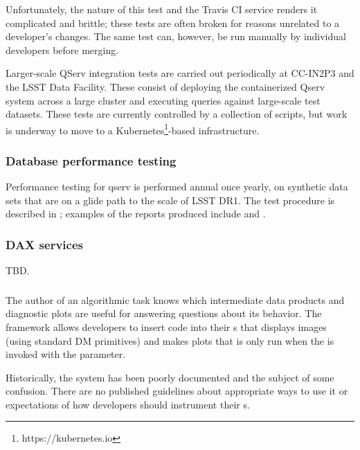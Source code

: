 \documentclass[DM,authoryear,toc,lsstdraft]{lsstdoc}
\begin{document}
Unfortunately, the nature of this test and the Travis CI service renders it
complicated and brittle; these tests are often broken for reasons unrelated to
a developer's changes. The same test can, however, be run manually by
individual developers before merging.

Larger-scale QServ integration tests are carried out periodically at CC-IN2P3
and the LSST Data Facility. These consist of deploying the containerized Qserv
system across a large cluster and executing queries against large-scale test
datasets. These tests are currently controlled by a collection of scripts, but
work is underway to move to a Kubernetes\footnote{https://kubernetes.io}-based
infrastructure.

\subsubsection{Database performance testing}
\label{sec:current:dax:dbperf}

Performance testing for qserv is performed annual once yearly, on synthetic
data sets that are on a glide path to the scale of LSST DR1. The test
procedure is described in ; examples of the reports produced
include  and .

\subsubsection{DAX services}

\begin{warning}
TBD.
\end{warning}

\subsubsection{}
\label{sec:current:dax:debugopt}

The author of an algorithmic task knows which intermediate data products and
diagnostic plots are useful for answering questions about its behavior. The
 framework allows developers to insert code into their
s that displays images (using standard DM primitives) and makes
plots that is only run when the  is invoked with the
 parameter.

Historically, the  system has been poorly documented and the
subject of some confusion. There are no published guidelines about appropriate
ways to use it or expectations of how developers should instrument their
s.
\end{document}
